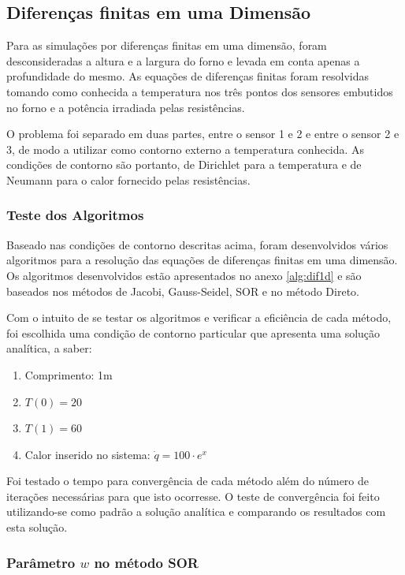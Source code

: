\subsection{Diferenças finitas em uma Dimensão}

Para as simulações por diferenças finitas em uma dimensão, foram desconsideradas a altura e a largura do forno e levada em conta apenas a profundidade do mesmo. As equações de diferenças finitas foram resolvidas tomando como conhecida a temperatura nos três pontos dos sensores embutidos no forno e a potência irradiada pelas resistências.

O problema foi separado em duas partes, entre o sensor 1 e 2 e entre o sensor 2 e 3, de modo a utilizar como contorno externo a temperatura conhecida. As condições de contorno são portanto, de Dirichlet para a temperatura e de Neumann para o calor fornecido pelas resistências.


\subsubsection{Teste dos Algoritmos}\label{teste_alg}

Baseado nas condições de contorno descritas acima, foram desenvolvidos vários algoritmos para a resolução das equações de diferenças finitas em uma dimensão. Os algoritmos desenvolvidos estão apresentados no anexo \ref{alg:dif1d} e são baseados nos métodos de Jacobi, Gauss-Seidel, SOR e no método Direto. 

Com o intuito de se testar os algoritmos e verificar a eficiência de cada método, foi escolhida uma condição de contorno particular que apresenta uma solução analítica, a saber:

\begin{enumerate}
    \item Comprimento: 1m
    \item $T(0) = 20$
    \item $T(1) = 60$
    \item Calor inserido no sistema: $\dot{q} = 100 \cdot e^x$
\end{enumerate}

Foi testado o tempo para convergência de cada método além do número de iterações necessárias para que isto ocorresse. O teste de convergência foi feito utilizando-se como padrão a solução analítica e comparando os resultados com esta solução.


\subsubsection{Parâmetro $w$ no método SOR}

